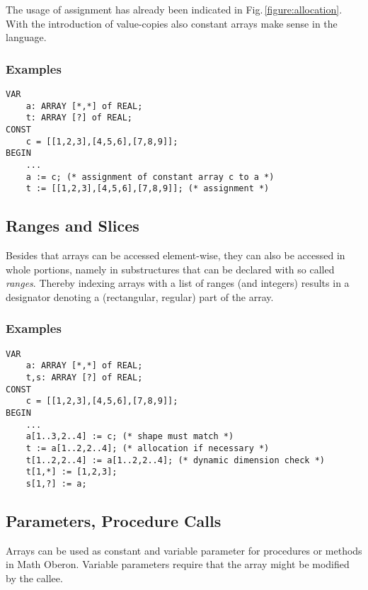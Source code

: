 \documentclass[a4wide,11pt]{article}
\begin{document}
The usage of assignment has already been indicated in Fig.\,\ref{figure:allocation}.
With the introduction of value-copies also constant arrays make sense in the language.

\begin{annotation}
\subsubsection{Examples}
\begin{lstlisting}[style=example, caption=Example of constant arrays and assignment,label=figure:constarrays]
VAR
    a: ARRAY [*,*] of REAL;
    t: ARRAY [?] of REAL;
CONST
    c = [[1,2,3],[4,5,6],[7,8,9]];
BEGIN
    ...
    a := c; (* assignment of constant array c to a *)
    t := [[1,2,3],[4,5,6],[7,8,9]]; (* assignment *)
\end{lstlisting}
\end{annotation}



\subsection{Ranges and Slices} Besides that arrays can be accessed element-wise, they can also be accessed in whole portions, namely in substructures that can be declared with so called \emph{ranges}.
Thereby indexing arrays with a list of ranges (and integers) results in a designator denoting a (rectangular, regular) part of the array.

\begin{annotation}
\subsubsection{Examples}
\begin{lstlisting}[style=example, caption=Example of ranges and their application,label=figure:ranges]
VAR
    a: ARRAY [*,*] of REAL;
    t,s: ARRAY [?] of REAL;
CONST
    c = [[1,2,3],[4,5,6],[7,8,9]];
BEGIN
    ...
    a[1..3,2..4] := c; (* shape must match *)
    t := a[1..2,2..4]; (* allocation if necessary *)
    t[1..2,2..4] := a[1..2,2..4]; (* dynamic dimension check *)
    t[1,*] := [1,2,3];
    s[1,?] := a;
\end{lstlisting}
\end{annotation}


\subsection{Parameters, Procedure Calls}\label{section:procedurecall}
Arrays can be used as constant and variable parameter for procedures or methods in Math Oberon.
Variable parameters require that the array might be modified by the callee.
\end{document}
